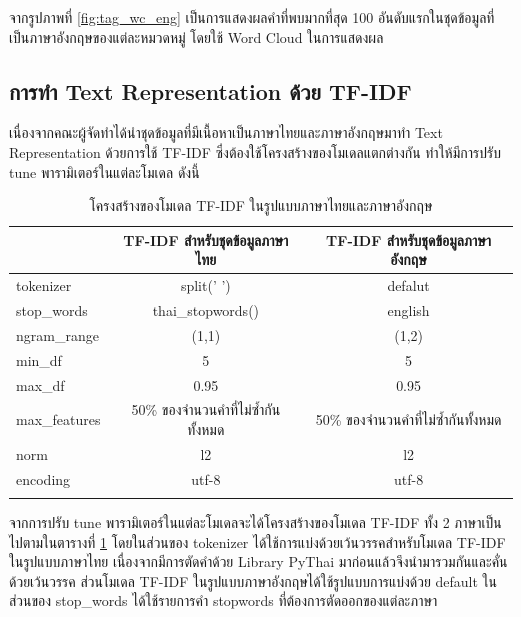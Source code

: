 \documentclass[12pt,oneside,openright,a4paper]{cpe-thai-project}
\begin{document}
        \hspace{1cm}จากรูปภาพที่ \ref{fig:tag_wc_eng} เป็นการแสดงผลคำที่พบมากที่สุด 100 อันดับแรกในชุดข้อมูลที่เป็นภาษาอังกฤษของแต่ละหมวดหมู่ โดยใช้ Word Cloud ในการแสดงผล
        \newpage

    \subsection{การทำ Text Representation ด้วย TF-IDF}
      \hspace{1cm}เนื่องจากคณะผู้จัดทำได้นำชุดข้อมูลที่มีเนื้อหาเป็นภาษาไทยและภาษาอังกฤษมาทำ Text Representation ด้วยการใช้ TF-IDF ซึ่งต้องใช้โครงสร้างของโมเดลแตกต่างกัน 
      ทำให้มีการปรับ tune พารามิเตอร์ในแต่ละโมเดล ดังนี้ 
      \begin{longtable}[!ht]{lcc}
        \caption{โครงสร้างของโมเดล TF-IDF ในรูปแบบภาษาไทยและภาษาอังกฤษ}\label{tbl:tfidf_feature} \\
        \hhline{===}
        \multicolumn{1}{c}{\textbf{โครงสร้าง}} & \textbf{TF-IDF สำหรับชุดข้อมูลภาษาไทย} & \textbf{TF-IDF สำหรับชุดข้อมูลภาษาอังกฤษ} \\ \hline
        \endhead
        tokenizer     & split(' ')        & defalut      \\ 
        stop\_words   & thai\_stopwords() & english      \\ 
        ngram\_range  & (1,1)             & (1,2)        \\ 
        min\_df       & 5                 & 5            \\ 
        max\_df       & 0.95              & 0.95         \\ 
        max\_features & 50\% ของจำนวนคำที่ไม่ซ้ำกันทั้งหมด             & 50\% ของจำนวนคำที่ไม่ซ้ำกันทั้งหมด       \\ 
        norm          & l2                & l2           \\ 
        encoding      & utf-8             & utf-8        \\ \hhline{===}
      \end{longtable} 
      \hspace{1cm}จากการปรับ tune พารามิเตอร์ในแต่ละโมเดลจะได้โครงสร้างของโมเดล TF-IDF ทั้ง 2 ภาษาเป็นไปตามในตารางที่ \ref{tbl:tfidf_feature}
      โดยในส่วนของ tokenizer ได้ใช้การแบ่งด้วยเว้นวรรคสำหรับโมเดล TF-IDF ในรูปแบบภาษาไทย 
      เนื่องจากมีการตัดคำด้วย Library PyThai มาก่อนแล้วจึงนำมารวมกันและคั่นด้วยเว้นวรรค ส่วนโมเดล TF-IDF ในรูปแบบภาษาอังกฤษได้ใช้รูปแบบการแบ่งด้วย default
      \newline\hspace*{1cm}ในส่วนของ stop\_words ได้ใช้รายการคำ stopwords ที่ต้องการตัดออกของแต่ละภาษา
\end{document}
